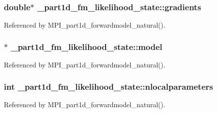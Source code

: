 \subsubsection[{\texorpdfstring{gradients}{gradients}}]{\setlength{\rightskip}{0pt plus 5cm}double$\ast$ \+\_\+part1d\+\_\+fm\+\_\+likelihood\+\_\+state\+::gradients}\hypertarget{struct__part1d__fm__likelihood__state_a1ed8d7d2f967d8b4a12f3d2d873999f1}{}\label{struct__part1d__fm__likelihood__state_a1ed8d7d2f967d8b4a12f3d2d873999f1}


Referenced by M\+P\+I\+\_\+part1d\+\_\+forwardmodel\+\_\+natural().

\subsubsection[{\texorpdfstring{model}{model}}]{$\ast$ \+\_\+part1d\+\_\+fm\+\_\+likelihood\+\_\+state\+::model}\hypertarget{struct__part1d__fm__likelihood__state_a778c2db4eceda0bf01e2288deb3ab7f7}{}\label{struct__part1d__fm__likelihood__state_a778c2db4eceda0bf01e2288deb3ab7f7}


Referenced by M\+P\+I\+\_\+part1d\+\_\+forwardmodel\+\_\+natural().

\subsubsection[{\texorpdfstring{nlocalparameters}{nlocalparameters}}]{\setlength{\rightskip}{0pt plus 5cm}int \+\_\+part1d\+\_\+fm\+\_\+likelihood\+\_\+state\+::nlocalparameters}\hypertarget{struct__part1d__fm__likelihood__state_a148f0a4b162f3a26f1ecb4c8a50e555d}{}\label{struct__part1d__fm__likelihood__state_a148f0a4b162f3a26f1ecb4c8a50e555d}


Referenced by M\+P\+I\+\_\+part1d\+\_\+forwardmodel\+\_\+natural().

